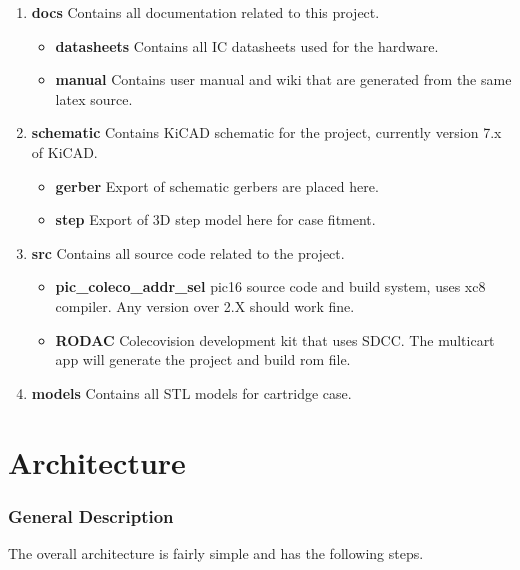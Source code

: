 \documentclass{article}
\begin{document}
  \begin{enumerate}
    \item \textbf{docs} Contains all documentation related to this project.
      \begin{itemize}
        \item \textbf{datasheets} Contains all IC datasheets used for the hardware.
        \item \textbf{manual} Contains user manual and wiki that are generated from the same latex source.
      \end{itemize}
    \item \textbf{schematic} Contains KiCAD schematic for the project, currently version 7.x of KiCAD.
      \begin{itemize}
        \item \textbf{gerber} Export of schematic gerbers are placed here.
        \item \textbf{step} Export of 3D step model here for case fitment.
      \end{itemize}
    \item \textbf{src} Contains all source code related to the project.
      \begin{itemize}
        \item \textbf{pic\_coleco\_addr\_sel} pic16 source code and build system, uses xc8 compiler. Any version over 2.X should work fine.
        \item \textbf{RODAC} Colecovision development kit that uses SDCC. The multicart app will generate the project and build rom file.
      \end{itemize}
    \item \textbf{models} Contains all STL models for cartridge case.
  \end{enumerate}

  \newpage

  \section{Architecture}
  \subsubsection{General Description}

  \par
  The overall architecture is fairly simple and has the following steps.
\end{document}
